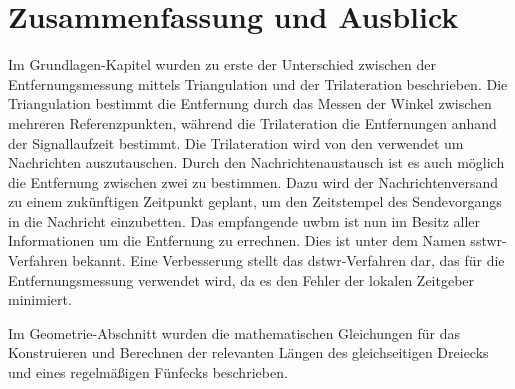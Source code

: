 %
%	
%	
%
\chapter{Zusammenfassung und Ausblick}

Im Grundlagen-Kapitel wurden zu erste der Unterschied zwischen der Entfernungsmessung mittels Triangulation und der Trilateration beschrieben. Die Triangulation bestimmt die Entfernung durch das Messen der Winkel zwischen mehreren Referenzpunkten, während die Trilateration die Entfernungen anhand der Signallaufzeit bestimmt. Die Trilateration wird von den  verwendet um Nachrichten auszutauschen. Durch den Nachrichtenaustausch ist es auch möglich die Entfernung zwischen zwei  zu bestimmen. Dazu wird der Nachrichtenversand zu einem zukünftigen Zeitpunkt geplant, um den Zeitstempel des Sendevorgangs in die Nachricht einzubetten. Das empfangende \gls{uwbm} ist nun im Besitz aller Informationen um die Entfernung zu errechnen. Dies ist unter dem Namen \gls{sstwr}-Verfahren bekannt. Eine Verbesserung stellt das \gls{dstwr}-Verfahren dar, das für die Entfernungsmessung verwendet wird, da es den Fehler der lokalen Zeitgeber minimiert.

Im Geometrie-Abschnitt wurden die mathematischen Gleichungen für das Konstruieren und Berechnen der relevanten Längen des gleichseitigen Dreiecks und eines regelmäßigen Fünfecks beschrieben.


